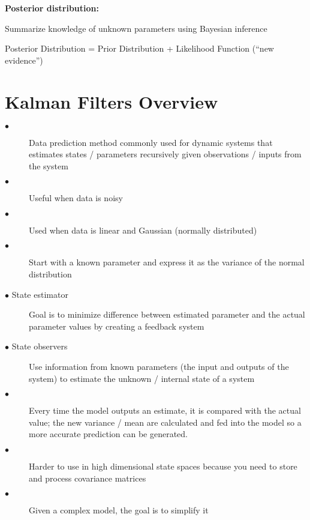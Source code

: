\documentclass{article}
\begin{document}
\textbf{Posterior distribution:}
\begin{description} [labelindent=1cm]
  \item[$\bullet$] Summarize knowledge of unknown parameters using Bayesian inference
  \item[$\bullet$] Posterior Distribution = Prior Distribution + Likelihood Function (“new evidence”)
\end{description}



\section {Kalman Filters Overview }
\begin{description}
  \item[$\bullet$] Data prediction method commonly used for dynamic systems that estimates states / parameters recursively given observations / inputs from the system \cite{inbook} 
  \item[$\bullet$] Useful when data is noisy \cite{inproceedings, article7}
  \item[$\bullet$] Used when data is linear and Gaussian (normally distributed) \cite{article7}
  \item[$\bullet$] Start with a known parameter and express it as the variance of the normal distribution 
  \item[$\bullet$ State estimator] Goal is to minimize difference between estimated parameter and the actual parameter values by creating a feedback system
  \item[$\bullet$ State observers] Use information from known parameters (the input and outputs of the system) to estimate the unknown / internal state of a system \cite{inbook} 
  \item[$\bullet$] Every time the model outputs an estimate, it is compared with the actual value; the new variance / mean are calculated and fed into the model so a more accurate prediction can be generated.
  \item[$\bullet$] Harder to use in high dimensional state spaces because you need to store and process covariance matrices \cite{inproceedings3}
  \item[$\bullet$] Given a complex model, the goal is to simplify it 
\end{description} 
\end{document}
